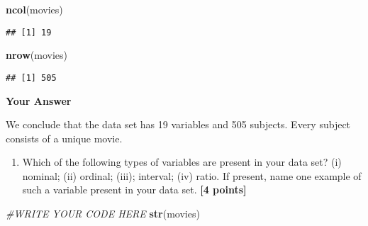 \documentclass[
]{article}
\newenvironment{Shaded}{\begin{snugshade}}{\end{snugshade}}
\newcommand{\CommentTok}[1]{\textcolor[rgb]{0.56,0.35,0.01}{\textit{#1}}}
\newcommand{\FunctionTok}[1]{\textcolor[rgb]{0.13,0.29,0.53}{\textbf{#1}}}
\newcommand{\NormalTok}[1]{#1}
\providecommand{\tightlist}{%
  \setlength{\itemsep}{0pt}\setlength{\parskip}{0pt}}
\begin{document}
\begin{Shaded}
\begin{Highlighting}[]
\FunctionTok{ncol}\NormalTok{(movies)}
\end{Highlighting}
\end{Shaded}

\begin{verbatim}
## [1] 19
\end{verbatim}

\begin{Shaded}
\begin{Highlighting}[]
\FunctionTok{nrow}\NormalTok{(movies)}
\end{Highlighting}
\end{Shaded}

\begin{verbatim}
## [1] 505
\end{verbatim}

\textbf{Your Answer}

We conclude that the data set has 19 variables and 505 subjects. Every
subject consists of a unique movie.

\begin{enumerate}
\def\labelenumi{\arabic{enumi}.}
\setcounter{enumi}{1}
\tightlist
\item
  Which of the following types of variables are present in your data
  set? (i) nominal; (ii) ordinal; (iii); interval; (iv) ratio. If
  present, name one example of such a variable present in your data set.
  \textbf{[4 points]}
\end{enumerate}

\begin{Shaded}
\begin{Highlighting}[]
\CommentTok{\#WRITE YOUR CODE HERE}
\FunctionTok{str}\NormalTok{(movies)}
\end{Highlighting}
\end{Shaded}
\end{document}
